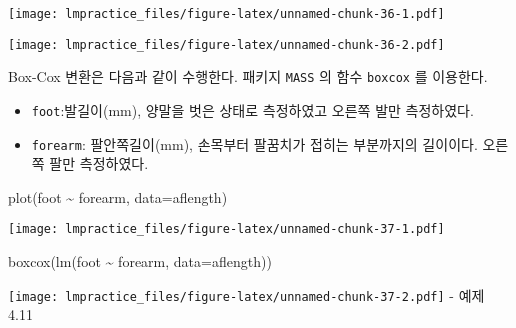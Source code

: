 \documentclass[
]{book}
\newenvironment{Shaded}{\begin{snugshade}}{\end{snugshade}}
\newcommand{\AttributeTok}[1]{\textcolor[rgb]{0.77,0.63,0.00}{#1}}
\newcommand{\FunctionTok}[1]{\textcolor[rgb]{0.00,0.00,0.00}{#1}}
\newcommand{\NormalTok}[1]{#1}
\newcommand{\OtherTok}[1]{\textcolor[rgb]{0.56,0.35,0.01}{#1}}
\newcommand{\SpecialCharTok}[1]{\textcolor[rgb]{0.00,0.00,0.00}{#1}}
\providecommand{\tightlist}{%
  \setlength{\itemsep}{0pt}\setlength{\parskip}{0pt}}
\begin{document}
\texttt{[image: lmpractice\_files/figure-latex/unnamed-chunk-36-1.pdf]}

\begin{Shaded}
\end{Shaded}

\texttt{[image: lmpractice\_files/figure-latex/unnamed-chunk-36-2.pdf]}

Box-Cox 변환은 다음과 같이 수행한다. 패키지 \texttt{MASS} 의 함수 \texttt{boxcox} 를 이용한다.

\begin{itemize}
\tightlist
\item
  \texttt{foot}:발길이(mm), 양말을 벗은 상태로 측정하였고 오른쪽 발만 측정하였다.
\item
  \texttt{forearm}: 팔안쪽길이(mm), 손목부터 팔꿈치가 접히는 부분까지의 길이이다. 오른쪽 팔만 측정하였다.
\end{itemize}

\begin{Shaded}
\begin{Highlighting}[]
\FunctionTok{plot}\NormalTok{(foot }\SpecialCharTok{\textasciitilde{}}\NormalTok{ forearm, }\AttributeTok{data=}\NormalTok{aflength)}
\end{Highlighting}
\end{Shaded}

\texttt{[image: lmpractice\_files/figure-latex/unnamed-chunk-37-1.pdf]}

\begin{Shaded}
\begin{Highlighting}[]
\FunctionTok{boxcox}\NormalTok{(}\FunctionTok{lm}\NormalTok{(foot }\SpecialCharTok{\textasciitilde{}}\NormalTok{ forearm, }\AttributeTok{data=}\NormalTok{aflength))}
\end{Highlighting}
\end{Shaded}

\texttt{[image: lmpractice\_files/figure-latex/unnamed-chunk-37-2.pdf]}
- 예제 4.11
\end{document}
